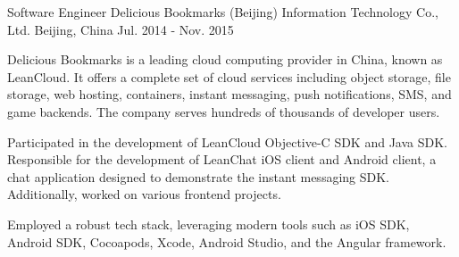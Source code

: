 \begin{cventries}
\cventry
{Software Engineer} %
{Delicious Bookmarks (Beijing) Information Technology Co., Ltd.} %
{Beijing, China} %
{Jul. 2014 - Nov. 2015} %
{
  \begin{cvitems} %
    \item {Delicious Bookmarks is a leading cloud computing provider in China, known as LeanCloud. It offers a complete set of cloud services including object storage, file storage, web hosting, containers, instant messaging, push notifications, SMS, and game backends. The company serves hundreds of thousands of developer users.}
    \item {Participated in the development of LeanCloud Objective-C SDK and Java SDK. Responsible for the development of LeanChat iOS client and Android client, a chat application designed to demonstrate the instant messaging SDK. Additionally, worked on various frontend projects.}
    \item {Employed a robust tech stack, leveraging modern tools such as iOS SDK, Android SDK, Cocoapods, Xcode, Android Studio, and the Angular framework.}
  \end{cvitems}
}


\end{cventries}
